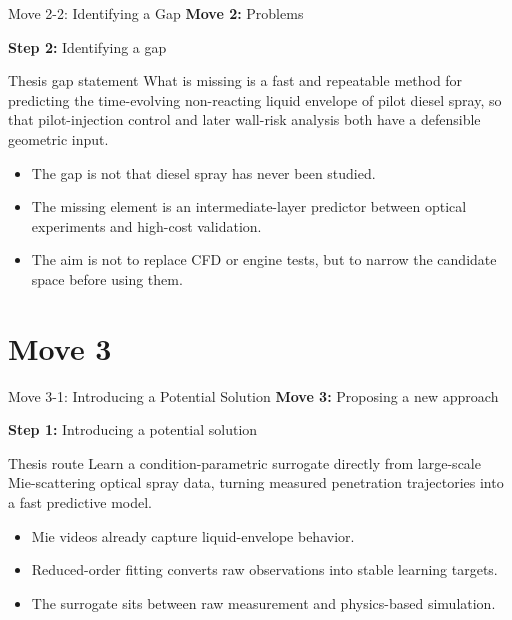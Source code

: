 \documentclass[aspectratio=169,11pt]{beamer}
\newcommand{\movetag}[2]{\textbf{Move #1:} #2}
\newcommand{\steptag}[2]{\textbf{Step #1:} #2}
\begin{document}
\begin{frame}{Move 2-2: Identifying a Gap}
\small
\movetag{2}{Problems}

\vspace{0.5em}
\steptag{2}{Identifying a gap}

\vspace{0.8em}
\begin{block}{Thesis gap statement}
What is missing is a fast and repeatable method for predicting the time-evolving non-reacting liquid envelope of pilot diesel spray, so that pilot-injection control and later wall-risk analysis both have a defensible geometric input.
\end{block}

\begin{itemize}
  \item The gap is not that diesel spray has never been studied.
  \item The missing element is an intermediate-layer predictor between optical experiments and high-cost validation.
  \item The aim is not to replace CFD or engine tests, but to narrow the candidate space before using them.
\end{itemize}
\end{frame}

\section{Move 3}

\begin{frame}{Move 3-1: Introducing a Potential Solution}
\small
\movetag{3}{Proposing a new approach}

\vspace{0.5em}
\steptag{1}{Introducing a potential solution}

\vspace{0.8em}
\begin{block}{Thesis route}
Learn a condition-parametric surrogate directly from large-scale Mie-scattering optical spray data, turning measured penetration trajectories into a fast predictive model.
\end{block}

\begin{itemize}
  \item Mie videos already capture liquid-envelope behavior.
  \item Reduced-order fitting converts raw observations into stable learning targets.
  \item The surrogate sits between raw measurement and physics-based simulation.
\end{itemize}
\end{frame}
\end{document}
